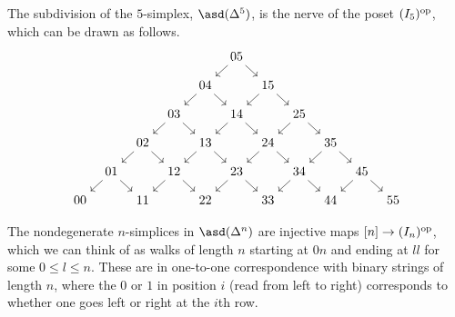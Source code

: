 \documentclass[main.tex]{subfiles}
\begin{document}
\begin{example}
  The subdivision of the $5$-simplex, $\asd(\Delta^{5})$, is the nerve of the poset $(I_{5})^{\mathrm{op}}$, which can be drawn as follows.
  \begin{equation*}
    \begin{tikzcd}[column sep=tiny, row sep=small]
      &&&&& 05
      \arrow[dl]
      \arrow[dr]
      \\
      &&&& 04
      \arrow[dl]
      \arrow[dr]
      && 15
      \arrow[dl]
      \arrow[dr]
      \\
      &&& 03
      \arrow[dl]
      \arrow[dr]
      && 14
      \arrow[dl]
      \arrow[dr]
      && 25
      \arrow[dl]
      \arrow[dr]
      \\
      && 02
      \arrow[dl]
      \arrow[dr]
      && 13
      \arrow[dl]
      \arrow[dr]
      && 24
      \arrow[dl]
      \arrow[dr]
      && 35
      \arrow[dl]
      \arrow[dr]
      \\
      & 01
      \arrow[dl]
      \arrow[dr]
      && 12
      \arrow[dl]
      \arrow[dr]
      && 23
      \arrow[dl]
      \arrow[dr]
      && 34
      \arrow[dl]
      \arrow[dr]
      && 45
      \arrow[dl]
      \arrow[dr]
      \\
      00
      && 11
      && 22
      && 33
      && 44
      && 55
    \end{tikzcd}
  \end{equation*}
\end{example}

The nondegenerate $n$-simplices in $\asd(\Delta^{n})$ are injective maps $[n] \to (I_{n})^{\mathrm{op}}$, which we can think of as walks of length $n$ starting at $0n$ and ending at $ll$ for some $0 \leq l \leq n$. These are in one-to-one correspondence with binary strings of length $n$, where the $0$ or $1$ in position $i$ (read from left to right) corresponds to whether one goes left or right at the $i$th row.
\end{document}
